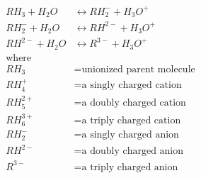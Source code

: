 \documentclass[fleqn, oneside, 11pt]{article}%
\begin{document}
\begin{preview}
\begin{align*}%
RH_{3} + H_{2}O & \leftrightarrow RH^{-}_{2} + H_{3}O^{+} \nonumber \\ 
RH^{-}_{2} + H_{2}O & \leftrightarrow RH^{2-} + H_{3}O^{+} \nonumber \\ 
RH^{2-} + H_{2}O & \leftrightarrow R^{3-} + H_{3}O^{+} \nonumber \\ 
\text{where} \nonumber \\
RH_{3} & = \text{unionized parent molecule} \nonumber \\
RH^{+}_{4} & = \text{a singly charged cation} \nonumber \\
RH^{2+}_{5} & = \text{a doubly charged cation} \nonumber \\
RH^{3+}_{6} & = \text{a triply charged cation} \nonumber \\
RH^{-}_{2} & = \text{a singly charged anion} \nonumber \\
RH^{2-} & = \text{a doubly charged anion} \nonumber \\
R^{3-} & = \text{a triply charged anion} \nonumber \\
\end{align*} 
\end{preview}
\end{document}
